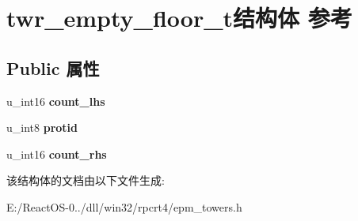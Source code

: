 \hypertarget{structtwr__empty__floor__t}{}\section{twr\+\_\+empty\+\_\+floor\+\_\+t结构体 参考}
\label{structtwr__empty__floor__t}
\subsection*{Public 属性}
\begin{DoxyCompactItemize}
\item 
\mbox{\label{structtwr__empty__floor__t_a148be3b59ac06c3aaf2516f050a82f19}} 
u\+\_\+int16 {\bfseries count\+\_\+lhs}
\item 
\mbox{\label{structtwr__empty__floor__t_a489b1851a36adae32c29b037313fb843}} 
u\+\_\+int8 {\bfseries protid}
\item 
\mbox{\label{structtwr__empty__floor__t_aee79ce210efcad105f564eb30047cb28}} 
u\+\_\+int16 {\bfseries count\+\_\+rhs}
\end{DoxyCompactItemize}


该结构体的文档由以下文件生成\+:\begin{DoxyCompactItemize}
\item 
E\+:/\+React\+O\+S-\/0../dll/win32/rpcrt4/epm\+\_\+towers.\+h\end{DoxyCompactItemize}
